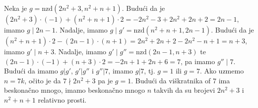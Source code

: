 \documentclass{exam}
\begin{document}
\begin{questions}
\begin{solution}
  Neka je $g = \text{nzd}(2n^2 + 3, n^2 + n + 1)$. Budući da je $(2n^2 + 3) \cdot (-1) + (n^2 + n + 1) \cdot 2 = -2n^2 - 3 + 2n^2 + 2n + 2 = 2n - 1$, imamo $g \mid 2n - 1$. Nadalje, imamo $g \mid g' = \text{nzd}(n^2 + n + 1, 2n - 1)$. Budući da je $(n^2 + n + 1) \cdot 2 - (2n - 1) \cdot (n + 1) = 2n^2 + 2n + 2 - 2n^2 - n + 1 = n + 3$, imamo $g' \mid n + 3$. Nadalje, imamo $g' \mid g'' = \text{nzd}(2n - 1, n + 3)$ te $(2n - 1) \cdot (-1) + (n + 3) \cdot 2 = -2n + 1 + 2n + 6 = 7$, pa imamo $g'' \mid 7$. Budući da imamo $g |g'$, $g' | g''$ i $g'' | 7$, imamo $g | 7$, tj. $g = 1$ ili $g = 7$.
  Ako uzmemo $n = 7k$, očito je da $7 \nmid 2n^2 + 3$ pa je $g = 1$. Budući da viškratnika of 7 ima beskonačno mnogo, imamo beskonačno mnogo $n$ takvih da su brojevi $2n^2 + 3$ i $n^2 + n + 1$ relativno prosti.
\end{solution}

\end{questions}
\end{document}
